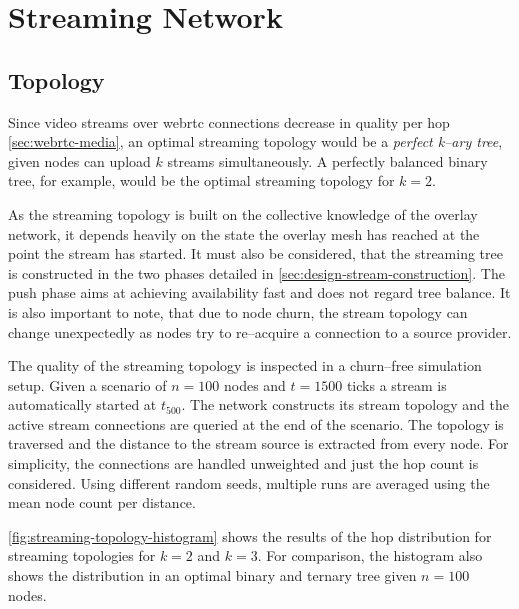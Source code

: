 \section{Streaming Network}

\subsection{Topology}

Since video streams over \gls{webrtc} connections decrease in quality per hop \cref{sec:webrtc-media}, an optimal streaming topology would be a \textit{perfect k–ary tree}, given nodes can upload $k$ streams simultaneously. A perfectly balanced binary tree, for example, would be the optimal streaming topology for $k=2$.

As the streaming topology is built on the collective knowledge of the overlay network, it depends heavily on the state the overlay mesh has reached at the point the stream has started. It must also be considered, that the streaming tree is constructed in the two phases detailed in \vref{sec:design-stream-construction}. The push phase aims at achieving availability fast and does not regard tree balance.
It is also important to note, that due to node churn, the stream topology can change unexpectedly as nodes try to re–acquire a connection to a source provider.

The quality of the streaming topology is inspected in a churn–free simulation setup. Given a scenario of $n=100$ nodes and $t=1500$ ticks a stream is automatically started at $t_{500}$. The network constructs its stream topology and the active stream connections are queried at the end of the scenario. The topology is traversed and the distance to the stream source is extracted from every node. For simplicity, the connections are handled unweighted and just the hop count is considered.
Using different random seeds, multiple runs are averaged using the mean node count per distance.

\vref{fig:streaming-topology-histogram} shows the results of the hop distribution for streaming topologies for $k=2$ and $k=3$. For comparison, the histogram also shows the distribution in an optimal binary and ternary tree given $n=100$ nodes.


